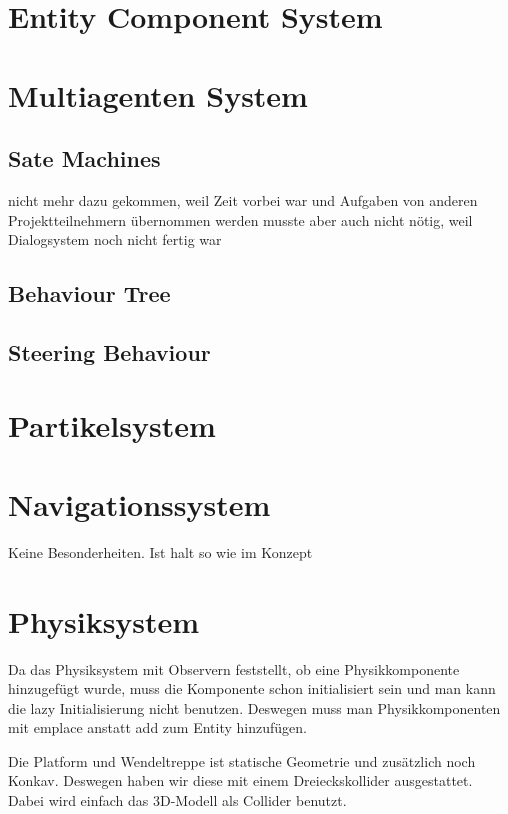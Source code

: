 
\section{Entity Component System}

\section{Multiagenten System}

\subsection{Sate Machines}

nicht mehr dazu gekommen, weil Zeit vorbei war und Aufgaben von anderen Projektteilnehmern übernommen werden musste
aber auch nicht nötig, weil Dialogsystem noch nicht fertig war

\subsection{Behaviour Tree}

\subsection{Steering Behaviour}

\section{Partikelsystem}

\section{Navigationssystem}

Keine Besonderheiten. Ist halt so wie im Konzept

\section{Physiksystem}

Da das Physiksystem mit Observern feststellt, ob eine Physikkomponente hinzugefügt wurde, muss die Komponente schon initialisiert sein und man kann die lazy Initialisierung nicht benutzen. Deswegen muss man Physikkomponenten mit emplace anstatt add zum Entity hinzufügen.

Die Platform und Wendeltreppe ist statische Geometrie und zusätzlich noch Konkav. Deswegen haben wir diese mit einem Dreieckskollider ausgestattet. Dabei wird einfach das 3D-Modell als Collider benutzt.

